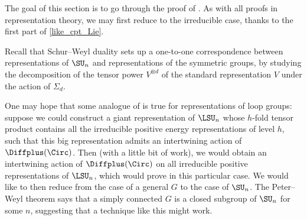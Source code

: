 The goal of this section is to go through the proof of .
As with all proofs in representation theory, we may first reduce to
the irreducible case, thanks to the first part of \cref{like_cpt_Lie}.
\begin{observation}\label{observe}
	Recall that Schur--Weyl duality sets up a one-to-one correspondence between
	representations of $\SU_n$ and representations of the symmetric groups, by
	studying the decomposition of the tensor power $V^{\otimes d}$ of the
	standard representation $V$ under the action of $\Sigma_d$.
\end{observation}
One may hope that some analogue of  is true for
representations of loop groups: suppose we could construct a giant
representation of $\LSU_n$ whose $h$-fold tensor product contains all the
irreducible positive energy representations of level $h$, such that this big
representation admits an intertwining action of $\Diffplus(\Circ)$. Then (with a
little bit of work), we would obtain an intertwining action of $\Diffplus(\Circ)$ on
all irreducible positive representations of $\LSU_n$, which would prove  in this particular case. We would like to then reduce from the
case of a general $G$ to the case of $\SU_n$. The Peter--Weyl theorem says that
a simply connected $G$ is a closed subgroup of $\SU_n$ for some $n$, suggesting
that a technique like this might work.

